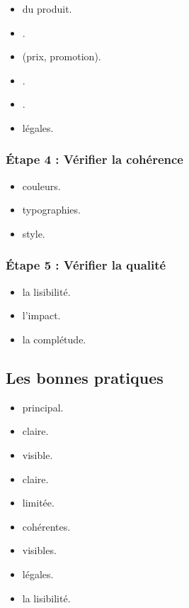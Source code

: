 \begin{itemize}
    \item {} du produit.
    \item {}.
    \item {} (prix, promotion).
    \item {}.
    \item {}.
    \item {} légales.
\end{itemize}

\subsubsection{Étape 4 : Vérifier la cohérence}

\begin{itemize}
    \item {} couleurs.
    \item {} typographies.
    \item {} style.
\end{itemize}

\subsubsection{Étape 5 : Vérifier la qualité}

\begin{itemize}
    \item {} la lisibilité.
    \item {} l'impact.
    \item {} la complétude.
\end{itemize}

\subsection{Les bonnes pratiques}

\begin{itemize}
    \item {} principal.
    \item {} claire.
    \item {} visible.
    \item {} claire.
    \item {} limitée.
    \item {} cohérentes.
    \item {} visibles.
    \item {} légales.
    \item {} la lisibilité.
\end{itemize}

